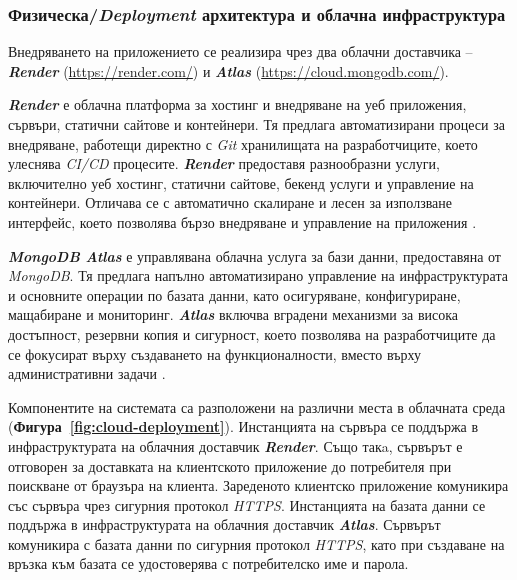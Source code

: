 \subsubsection{Физическа/\textit{Deployment} архитектура и облачна инфраструктура}  

\hspace*{2.5em}Внедряването на приложението се реализира чрез два облачни доставчика -- \textbf{\textit{Render}} (\url{https://render.com/}) и \textbf{\textit{Atlas}} (\url{https://cloud.mongodb.com/}).

\textbf{\textit{Render}} е облачна платформа за хостинг и внедряване на уеб приложения, сървъри, статични сайтове и контейнери. Тя предлага автоматизирани процеси за внедряване, работещи директно с \textit{Git} хранилищата на разработчиците, което улеснява \textit{CI/CD} процесите. \textbf{\textit{Render}} предоставя разнообразни услуги, включително уеб хостинг, статични сайтове, бекенд услуги и управление на контейнери. Отличава се с автоматично скалиране и лесен за използване интерфейс, което позволява бързо внедряване и управление на приложения \cite{RenderWebServices}.

\textbf{\textit{MongoDB Atlas}} е управлявана облачна услуга за бази данни, предоставяна от \textit{MongoDB}. Тя предлага напълно автоматизирано управление на инфраструктурата и основните операции по базата данни, като осигуряване, конфигуриране, мащабиране и мониторинг. \textbf{\textit{Atlas}} включва вградени механизми за висока достъпност, резервни копия и сигурност, което позволява на разработчиците да се фокусират върху създаването на функционалности, вместо върху административни задачи \cite{MongoDBAtlasDocs}.

Компонентите на системата са разположени на различни места в облачната среда (\textbf{Фигура~\ref{fig:cloud-deployment}}). Инстанцията на сървъра се поддържа в инфраструктурата на облачния доставчик \textbf{\textit{Render}}. Също такa, сървърът е отговорен за доставката на клиентското приложение до потребителя при поискване от браузъра на клиента. Зареденото клиентско приложение комуникира със сървъра чрез сигурния протокол \textit{HTTPS}. Инстанцията на базата данни се поддържа в инфраструктурата на облачния доставчик \textbf{\textit{Atlas}}. Сървърът комуникира с базата данни по сигурния протокол \textit{HTTPS}, като при създаване на връзка към базата се удостоверява с потребителско име и парола.


\vspace{0.25cm}

